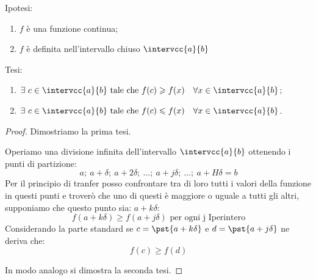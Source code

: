 
\noindent Ipotesi:
\begin{enumerate}[nosep]
 \item \(f\) è una funzione continua;
 \item \(f\) è definita nell'intervallo chiuso \(\intervcc{a}{b}\)
\end{enumerate}

\noindent Tesi: 
\begin{enumerate}[nosep]
 \item \(\exists~c \in \intervcc{a}{b} \text{ tale che }
         f(c) \geqslant f(x) \quad \forall x \in \intervcc{a}{b}\);
 \item \(\exists~c \in \intervcc{a}{b} \text{ tale che }
         f(c) \leqslant f(x) \quad \forall x \in \intervcc{a}{b}\).
\end{enumerate}

\begin{proof}
Dimostriamo la prima tesi.

Operiamo una divisione infinita dell'intervallo \(\intervcc{a}{b}\)
ottenendo i punti di partizione: 
\[a;~a+\delta;~a+2\delta;~\dots;~a+j\delta;~\dots;~a+H\delta=b\]
Per il principio di tranfer posso confrontare tra di loro tutti i valori della 
funzione in questi punti e troverò che uno di questi è maggiore o uguale a 
tutti gli altri, supponiamo che questo punto sia: \(a+k\delta\):
\[f(a+k\delta) \geqslant f(a+j\delta) \text{ per ogni j Iperintero}\]
Considerando la parte standard 
se \(c=\pst{a+k\delta}\) e \(d=\pst{a+j\delta}\)
ne deriva che:
\[f(c) \geqslant f(d)\]

In modo analogo si dimostra la seconda tesi.
\end{proof}


